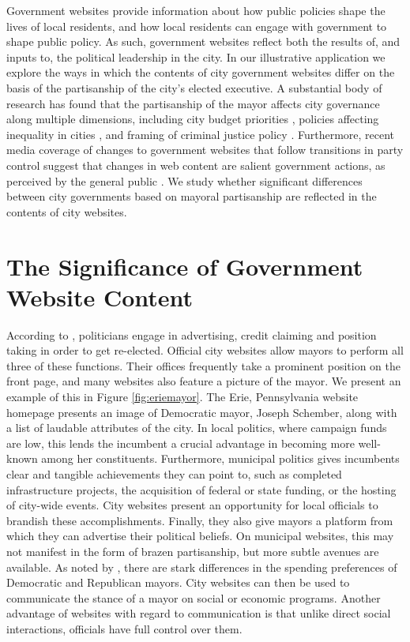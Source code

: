 \documentclass[11pt]{article}
\begin{document}
Government websites provide information about how public policies shape the lives of local residents, and how local residents can engage with government to shape public policy. As such, government websites reflect both the results of, and inputs to, the political leadership in the city. In our illustrative application we explore the ways in which the contents of city government websites differ on the basis of the partisanship of the city's elected executive. A substantial body of research has found that the partisanship of the mayor affects city governance along multiple dimensions, including city budget priorities \citep{de2016mayoral}, policies affecting inequality in cities \citep{einstein2016mayors}, and framing of criminal justice policy \citep{marion2013mayor}. Furthermore, recent media coverage of changes to government websites that follow transitions in party control suggest that changes in web content are salient government actions, as perceived by the general public \citep{sharfstein2017science,kirby2017trump,duarte2017deniable} . We study whether significant differences between city governments based on mayoral partisanship are reflected in the contents of city websites.


\section{The Significance of Government Website Content}

 According to \cite{Mayhew1974}, politicians engage in advertising, credit claiming and position taking in order to get re-elected. Official city websites allow mayors to perform all three of these functions. Their offices frequently take a prominent position on the front page, and many websites also feature a picture of the mayor. We present an example of this in Figure \ref{fig:eriemayor}. The Erie, Pennsylvania website homepage presents an image of Democratic mayor, Joseph Schember, along with a list of laudable attributes of the city. In local politics, where campaign funds are low, this lends the incumbent a crucial advantage in becoming more well-known among her constituents. Furthermore, municipal politics gives incumbents clear and tangible achievements they can point to, such as completed infrastructure projects, the acquisition of federal or state funding, or the hosting of city-wide events. City websites present an opportunity for local officials to brandish these accomplishments. Finally, they also give mayors a platform from which they can advertise their political beliefs. On municipal websites, this may not manifest in the form of brazen partisanship, but more subtle avenues are available. As noted by \cite{einstein2016mayors}, there are stark differences in the spending preferences of Democratic and Republican mayors. City websites can then be used to communicate the stance of a mayor on social or economic programs. Another advantage of websites with regard to communication is that unlike direct social interactions, officials have full control over them.
 
\end{document}
